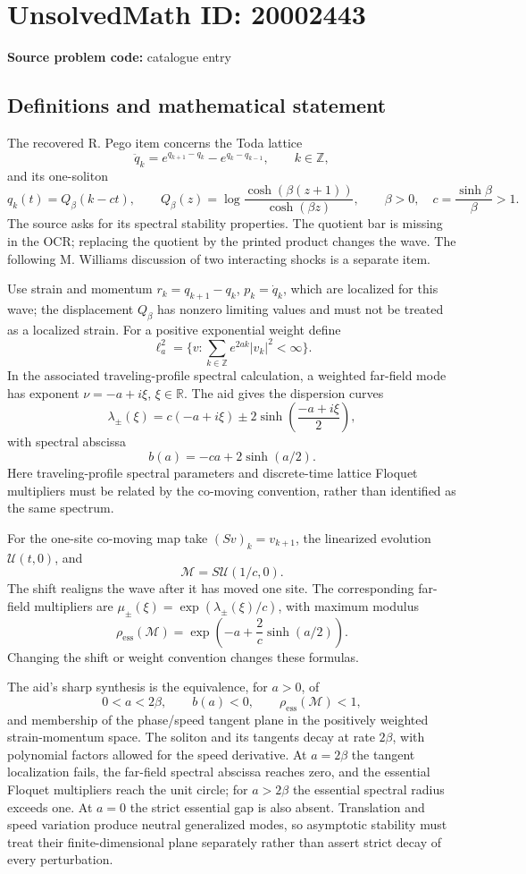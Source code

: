 \documentclass[11pt]{article}
\newcommand{\Z}{\mathbb{Z}}
\newcommand{\R}{\mathbb{R}}
\begin{document}
\section*{UnsolvedMath ID: 20002443}
\textbf{Source problem code:} catalogue entry
\subsection{Definitions and mathematical statement}
The recovered R. Pego item concerns the Toda lattice
\[
 \ddot q_k=e^{q_{k+1}-q_k}-e^{q_k-q_{k-1}},\qquad k\in\Z,
\]
and its one-soliton
\[
 q_k(t)=Q_\beta(k-ct),\qquad
 Q_\beta(z)=\log\frac{\cosh(\beta(z+1))}{\cosh(\beta z)},
 \qquad\beta>0,\quad c=\frac{\sinh\beta}{\beta}>1.
\]
The source asks for its spectral stability properties. The quotient bar is missing in the OCR; replacing the quotient by the printed product changes the wave. The following M. Williams discussion of two interacting shocks is a separate item.

Use strain and momentum \(r_k=q_{k+1}-q_k\), \(p_k=\dot q_k\), which are localized for this wave; the displacement \(Q_\beta\) has nonzero limiting values and must not be treated as a localized strain. For a positive exponential weight define
\[
 \ell_a^2=\{v:\sum_{k\in\Z}e^{2ak}|v_k|^2<\infty\}.
\]
In the associated traveling-profile spectral calculation, a weighted far-field mode has exponent \(\nu=-a+i\xi\), \(\xi\in\R\). The aid gives the dispersion curves
\[
 \lambda_\pm(\xi)=c(-a+i\xi)\pm2\sinh\!\left(\frac{-a+i\xi}{2}\right),
\]
with spectral abscissa
\[
 b(a)=-ca+2\sinh(a/2).
\]
Here traveling-profile spectral parameters and discrete-time lattice Floquet multipliers must be related by the co-moving convention, rather than identified as the same spectrum.

For the one-site co-moving map take \((Sv)_k=v_{k+1}\), the linearized evolution \(\mathcal U(t,0)\), and
\[
 \mathcal M=S\mathcal U(1/c,0).
\]
The shift realigns the wave after it has moved one site. The corresponding far-field multipliers are \(\mu_\pm(\xi)=\exp(\lambda_\pm(\xi)/c)\), with maximum modulus
\[
 \rho_{\mathrm{ess}}(\mathcal M)
 =\exp\!\left(-a+\frac2c\sinh(a/2)\right).
\]
Changing the shift or weight convention changes these formulas.

The aid's sharp synthesis is the equivalence, for \(a>0\), of
\[
 0<a<2\beta,\qquad b(a)<0,\qquad
 \rho_{\mathrm{ess}}(\mathcal M)<1,
\]
and membership of the phase/speed tangent plane in the positively weighted strain-momentum space. The soliton and its tangents decay at rate \(2\beta\), with polynomial factors allowed for the speed derivative. At \(a=2\beta\) the tangent localization fails, the far-field spectral abscissa reaches zero, and the essential Floquet multipliers reach the unit circle; for \(a>2\beta\) the essential spectral radius exceeds one. At \(a=0\) the strict essential gap is also absent. Translation and speed variation produce neutral generalized modes, so asymptotic stability must treat their finite-dimensional plane separately rather than assert strict decay of every perturbation.
\end{document}

